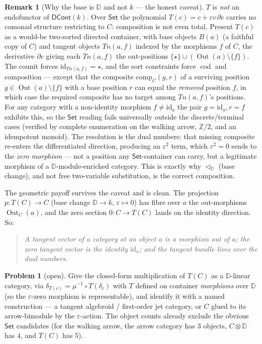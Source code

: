 \documentclass[11pt]{article}
\theoremstyle{definition}
\newtheorem{remark}[theorem]{Remark}
\newtheorem{problem}[theorem]{Problem}
\newcommand{\DCont}{\mathsf{DCont}}
\newcommand{\Set}{\mathsf{Set}}
\newcommand{\DD}{\mathbb{D}}
\newcommand{\id}{\mathrm{id}}
\newcommand{\Out}{\operatorname{Out}}
\newcommand{\cod}{\operatorname{cod}}
\begin{document}
\begin{remark}[Why the base is $\DD$ and not $k$ --- the honest caveat]\label{rem:caveat}
$T$ is \emph{not} an endofunctor of $\DCont(k)$. Over $\Set$ the polynomial $T(c)=c+\varepsilon v\,
\partial c$ carries no comonad structure restricting to $C$: composition is not even total. Present
$T(c)$ as a would-be two-sorted directed container, with base objects $B(a)$ (a faithful copy of $C$)
and tangent objects $Tn(a,f)$ indexed by the morphisms $f$ of $C$, the derivative $\partial c$ giving
each $Tn(a,f)$ the out-positions $\{\star\}\cup(\Out(a)\setminus\{f\})$. The counit forces
$\id_{Tn(a,f)}=\star$, and the sort constraints force $\cod$ and composition --- except that the
composite $\mathrm{comp}_C(g,r)$ of a surviving position $g\in\Out(a)\setminus\{f\}$ with a base
position $r$ can equal the \emph{removed} position $f$, in which case the required composite has no
target among $Tn(a,f)$'s positions. For any category with a non-identity morphism $f\neq\id_a$ the
pair $g=\id_a,r=f$ exhibits this, so the $\Set$ reading fails universally outside the
discrete/terminal cases (verified by complete enumeration on the walking arrow, $\mathbb{Z}/2$, and an
idempotent monoid). The resolution is the dual numbers: that missing composite re-enters the
differentiated direction, producing an $\varepsilon^2$ term, which $\varepsilon^2=0$ sends to the
\emph{zero morphism} --- not a position any $\Set$-container can carry, but a legitimate morphism of a
$\DD$-module-enriched category. This is exactly why $\lhd_\DD$ (base change), and not free
two-variable substitution, is the correct composition.
\end{remark}

The geometric payoff survives the caveat and is clean. The projection $p\colon T(C)\to C$ (base change
$\DD\to k$, $\varepsilon\mapsto0$) has fibre over $a$ the out-morphisms $\Out_C(a)$, and the zero
section $0\colon C\to T(C)$ lands on the identity direction. So:

\begin{quote}
\emph{A tangent vector of a category at an object $a$ is a morphism out of $a$; the zero tangent
vector is the identity $\id_a$; and the tangent bundle lives over the dual numbers.}
\end{quote}

\begin{problem}[open]\label{prob:closed-form}
Give the closed-form multiplication of $T(C)$ as a $\DD$-linear category, via
$\delta_{T(c)}=\mu^{-1}\circ T(\delta_c)$ with $T$ defined on container \emph{morphisms} over $\DD$ (so
the $\varepsilon$-zero morphism is representable), and identify it with a named construction --- a
tangent algebroid / first-order jet category, or $C$ glued to its arrow-bimodule by the
$\varepsilon$-action. The object counts already exclude the obvious $\Set$ candidates (for the walking
arrow, the arrow category has $3$ objects, $C\otimes\DD$ has $4$, and $T(C)$ has $5$).
\end{problem}
\end{document}
